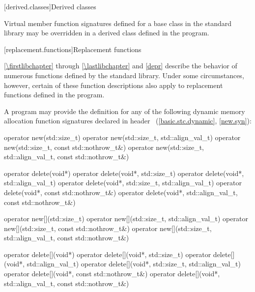[derived.classes]{Derived classes}

\pnum
Virtual member function signatures defined
%
for a base class in the \Cpp{} standard
%
%
library may be overridden in a derived class defined in the program.

[replacement.functions]{Replacement functions}

\pnum
{}%
\ref{\firstlibchapter} through \ref{\lastlibchapter} and \ref{depr}
describe the behavior of numerous functions defined by
the \Cpp{} standard library.
Under some circumstances,
%
however, certain of these function descriptions also apply to replacement functions defined
in the program.

\pnum
A \Cpp{} program may provide the definition for any of the following
dynamic memory allocation function signatures declared in header
~(\ref{basic.stc.dynamic}, \ref{new.syn}):
%
%
\begin{codeblock}
operator new(std::size_t)
operator new(std::size_t, std::align_val_t)
operator new(std::size_t, const std::nothrow_t&)
operator new(std::size_t, std::align_val_t, const std::nothrow_t&)
\end{codeblock}%
%
%
\begin{codeblock}
operator delete(void*)
operator delete(void*, std::size_t)
operator delete(void*, std::align_val_t)
operator delete(void*, std::size_t, std::align_val_t)
operator delete(void*, const std::nothrow_t&)
operator delete(void*, std::align_val_t, const std::nothrow_t&)
\end{codeblock}%
%
%
\begin{codeblock}
operator new[](std::size_t)
operator new[](std::size_t, std::align_val_t)
operator new[](std::size_t, const std::nothrow_t&)
operator new[](std::size_t, std::align_val_t, const std::nothrow_t&)
\end{codeblock}%
%
%
\begin{codeblock}
operator delete[](void*)
operator delete[](void*, std::size_t)
operator delete[](void*, std::align_val_t)
operator delete[](void*, std::size_t, std::align_val_t)
operator delete[](void*, const std::nothrow_t&)
operator delete[](void*, std::align_val_t, const std::nothrow_t&)
\end{codeblock}


